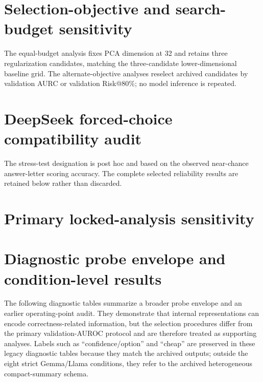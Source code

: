 \documentclass[preprint,12pt]{elsarticle}
\begin{document}
\clearpage
\section{Selection-objective and search-budget sensitivity}

\FloatBarrier

\FloatBarrier
The equal-budget analysis fixes PCA dimension at 32 and retains three regularization candidates, matching the three-candidate lower-dimensional baseline grid. The alternate-objective analyses reselect archived candidates by validation AURC or validation Risk@80\%; no model inference is repeated.

\clearpage
\section{DeepSeek forced-choice compatibility audit}

\FloatBarrier
The stress-test designation is post hoc and based on the observed near-chance answer-letter scoring accuracy. The complete selected reliability results are retained below rather than discarded.


\clearpage
\section{Primary locked-analysis sensitivity}

\FloatBarrier

\FloatBarrier

\FloatBarrier

\clearpage
\section{Diagnostic probe envelope and condition-level results}
The following diagnostic tables summarize a broader probe envelope and an earlier operating-point audit. They demonstrate that internal representations can encode correctness-related information, but the selection procedures differ from the primary validation-AUROC protocol and are therefore treated as supporting analyses. Labels such as ``confidence/option'' and ``cheap'' are preserved in these legacy diagnostic tables because they match the archived outputs; outside the eight strict Gemma/Llama conditions, they refer to the archived heterogeneous compact-summary schema.

\FloatBarrier

\FloatBarrier
\begin{landscape}

\FloatBarrier
\end{landscape}

\FloatBarrier

\FloatBarrier
\begin{landscape}

\FloatBarrier
\end{landscape}
\end{document}
